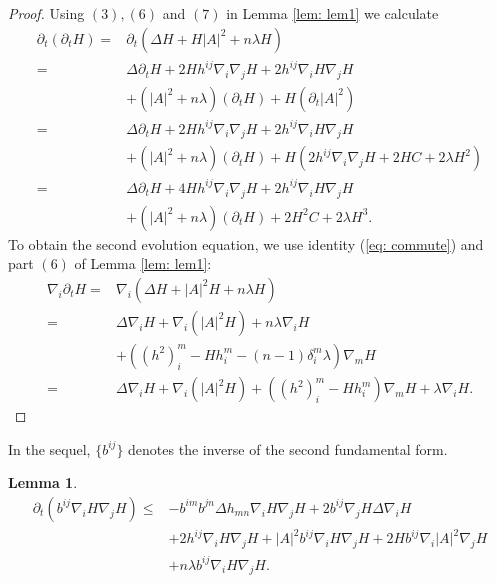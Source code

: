 \documentclass{amsart}
\newtheorem{lemma}[theorem]{Lemma}
\theoremstyle{definition}
\theoremstyle{remark}
\numberwithin{equation}{section}
\begin{document}
\begin{proof} Using $(3), (6)$ and $(7)$ in Lemma \ref{lem: lem1} we calculate
\begin{align*}
\partial_t(\partial_tH)=&\partial_t(\Delta H+H|A|^2+n\lambda H)\\
=&\Delta \partial_tH+2Hh^{ij}\nabla_i\nabla_jH+2h^{ij}\nabla_iH\nabla_jH\\
&+ (|A|^2+n\lambda )(\partial_t H)+H(\partial_t|A|^2)\\
=&\Delta \partial_tH+2Hh^{ij}\nabla_i\nabla_jH+2h^{ij}\nabla_iH\nabla_jH\\
&+ (|A|^2+n\lambda )(\partial_t H)+H(2h^{ij}\nabla_i\nabla_jH+2HC+2\lambda H^2)\\
=&\Delta \partial_tH+4Hh^{ij}\nabla_i\nabla_jH+2h^{ij}\nabla_iH\nabla_jH\\
&+(|A|^2+n\lambda )(\partial_t H)+2H^2C+2\lambda H^3.
\end{align*}
To obtain the second evolution equation, we use identity (\ref{eq: commute}) and part $(6)$ of Lemma \ref{lem: lem1}:
\begin{align*}
\nabla_i\partial_tH=&\nabla_i(\Delta H+|A|^2H+n\lambda H)\\
=&\Delta\nabla_iH+\nabla_i(|A|^2H)+n\lambda \nabla_iH\\
&+((h^2)_i^m-Hh_i^m-(n-1)\delta_i^m\lambda )\nabla_mH\\
=&\Delta\nabla_iH+\nabla_i(|A|^2H)+((h^2)_i^m-Hh_i^m)\nabla_mH+\lambda \nabla_iH.
\end{align*}
\end{proof}
In the sequel, $\{b^{ij}\}$ denotes the inverse of the second fundamental form.
\begin{lemma}\label{lem: lem 3}
\begin{align*}
\partial_t( b^{ij}\nabla_iH\nabla_jH)\leq&-b^{im}b^{jn}\Delta h_{mn}\nabla_iH\nabla_jH+2b^{ij}\nabla_jH\Delta\nabla_iH\\
&+2h^{ij}\nabla_iH\nabla_jH
+|A|^2b^{ij}\nabla_iH\nabla_jH+2Hb^{ij}\nabla_i|A|^2\nabla_jH\\
&+n\lambda b^{ij}\nabla_iH\nabla_jH.
\end{align*}
\end{lemma}
\end{document}
